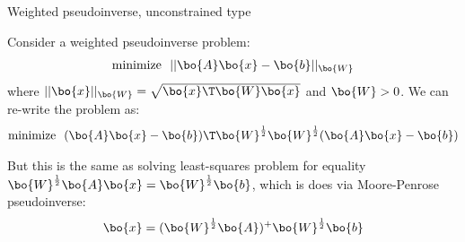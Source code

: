 \documentclass{beamer}
\begin{document}
\begin{frame}{Weighted pseudoinverse, unconstrained type}
	\begin{flushleft}
		
		Consider a weighted pseudoinverse problem:
		\begin{align}
			\text{minimize} \ \ ||\bo{A}\bo{x}-\bo{b}||_\bo{W}
		\end{align}		
		where $||\bo{x}||_\bo{W} = \sqrt{\bo{x}\T\bo{W}\bo{x}}$ and $\bo{W} > 0$. We can re-write the problem as:
		\begin{align}
			\text{minimize} \ \ (\bo{A}\bo{x}-\bo{b})\T\bo{W}^\frac{1}{2}\bo{W}^\frac{1}{2}(\bo{A}\bo{x}-\bo{b})
		\end{align}
		
		But this is the same as solving least-squares problem for equality $\bo{W}^\frac{1}{2}\bo{A}\bo{x}=\bo{W}^\frac{1}{2}\bo{b}$, which is does via Moore-Penrose pseudoinverse:
		\begin{align}
			\bo{x}=(\bo{W}^\frac{1}{2}\bo{A})^+\bo{W}^\frac{1}{2}\bo{b}
		\end{align}
		
	\end{flushleft}
\end{frame}
\end{document}
